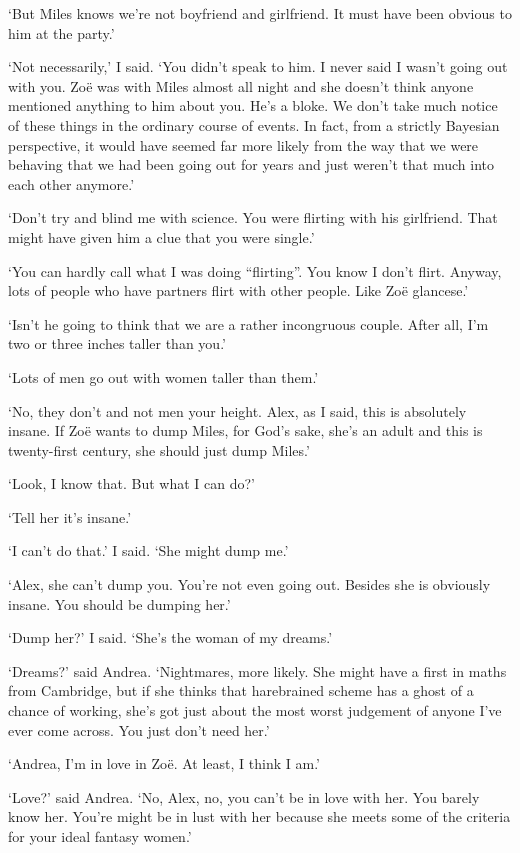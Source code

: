 `But Miles knows we're not boyfriend and girlfriend. It must have
been obvious to him at the party.'

`Not necessarily,' I said. `You didn't speak to him. I never said I
wasn't going out with you. Zoë was with Miles almost all night
and she doesn't think anyone mentioned anything to him about you.
He's a bloke. We don't take much notice of these things in the
ordinary course of events. In fact, from a strictly Bayesian
perspective, it would have seemed far more likely from the way that
we were behaving that we had been going out for years and just
weren't that much into each other anymore.'

`Don't try and blind me with science. You were flirting with his
girlfriend. That might have given him a clue that you were single.'

`You can hardly call what I was doing ``flirting''. You know I don't
flirt. Anyway, lots of people who have partners flirt with other
people. Like Zoë glancese.'

`Isn't he going to think that we are a rather incongruous couple.
After all, I'm two or three inches taller than you.'

`Lots of men go out with women taller than them.'

`No, they don't and not men your height. Alex, as I said, this is
absolutely insane. If Zoë wants to dump Miles, for God's sake,
she's an adult and this is twenty-first century, she should just
dump Miles.'

`Look, I know that. But what I can do?'

`Tell her it's insane.'

`I can't do that.' I said. `She might dump me.'

`Alex, she can't dump you. You're not even going out. Besides she is
obviously insane. You should be dumping her.'

`Dump her?' I said. `She's the woman of my dreams.'

`Dreams?' said Andrea. `Nightmares, more likely. She might have a
first in maths from Cambridge, but if she thinks that harebrained
scheme has a ghost of a chance of working, she's got just about the
most worst judgement of anyone I've ever come across. You just don't
need her.'

`Andrea, I'm in love in Zoë. At least, I think I am.'

`Love?' said Andrea. `No, Alex, no, you can't be in love with her.
You barely know her. You're might be in lust with her because she
meets some of the criteria for your ideal fantasy women.'

